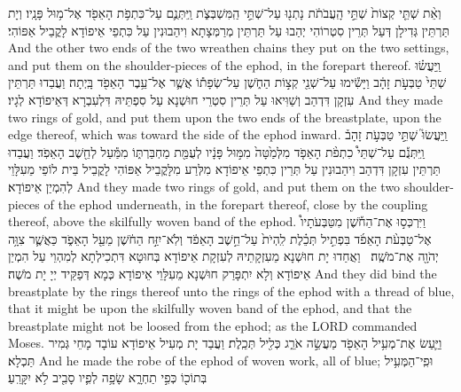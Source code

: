 {%
{וְאֵ֨ת שְׁתֵּ֤י קְצוֹת֙ שְׁתֵּ֣י הָֽעֲבֹתֹ֔ת נָתְנ֖וּ עַל־שְׁתֵּ֣י הַֽמִּשְׁבְּצֹ֑ת וַֽיִּתְּנֻ֛ם עַל־כִּתְפֹ֥ת הָאֵפֹ֖ד אֶל־מ֥וּל פָּנָֽיו׃}
{וְיָת תַּרְתֵּין גְּדִילָן דְּעַל תְּרֵין סִטְרוֹהִי יְהַבוּ עַל תַּרְתֵּין מְרַמְּצָתָא וִיהַבוּנִין עַל כִּתְפֵי אֵיפוֹדָא לָקֳבֵיל אַפּוֹהִי׃}
{And the other two ends of the two wreathen chains they put on the two settings, and put them on the shoulder-pieces of the ephod, in the forepart thereof.}{}
{וַֽיַּעֲשׂ֗וּ שְׁתֵּי֙ טַבְּעֹ֣ת זָהָ֔ב וַיָּשִׂ֕ימוּ עַל־שְׁנֵ֖י קְצ֣וֹת הַחֹ֑שֶׁן עַל־שְׂפָת֕וֹ אֲשֶׁ֛ר אֶל־עֵ֥בֶר הָאֵפֹ֖ד בָּֽיְתָה׃}
{וַעֲבַדוּ תַּרְתֵּין עִזְקָן דִּדְהַב וְשַׁוִּיאוּ עַל תְּרֵין סִטְרֵי חוּשְׁנָא עַל סִפְתֵּיהּ דִּלְעִבְרָא דְּאֵיפוֹדָא לְגָיו׃}
{And they made two rings of gold, and put them upon the two ends of the breastplate, upon the edge thereof, which was toward the side of the ephod inward.}{}
{וַֽיַּעֲשׂוּ֮ שְׁתֵּ֣י טַבְּעֹ֣ת זָהָב֒ וַֽיִּתְּנֻ֡ם עַל־שְׁתֵּי֩ כִתְפֹ֨ת הָאֵפֹ֤ד מִלְּמַ֙טָּה֙ מִמּ֣וּל פָּנָ֔יו לְעֻמַּ֖ת מַחְבַּרְתּ֑וֹ מִמַּ֕עַל לְחֵ֖שֶׁב הָאֵפֹֽד׃}
{וַעֲבַדוּ תַּרְתֵּין עִזְקָן דִּדְהַב וִיהַבוּנִין עַל תְּרֵין כִּתְפֵי אֵיפוֹדָא מִלְּרַע מִלָּקֳבֵיל אַפּוֹהִי לָקֳבֵיל בֵּית לוֹפֵי מֵעִלָּוֵי לְהִמְיַן אֵיפוֹדָא׃}
{And they made two rings of gold, and put them on the two shoulder-pieces of the ephod underneath, in the forepart thereof, close by the coupling thereof, above the skilfully woven band of the ephod.}{}
{וַיִּרְכְּס֣וּ אֶת־הַחֹ֡שֶׁן מִטַּבְּעֹתָיו֩ אֶל־טַבְּעֹ֨ת הָאֵפֹ֜ד בִּפְתִ֣יל תְּכֵ֗לֶת לִֽהְיֹת֙ עַל־חֵ֣שֶׁב הָאֵפֹ֔ד וְלֹֽא־יִזַּ֣ח הַחֹ֔שֶׁן מֵעַ֖ל הָאֵפֹ֑ד כַּאֲשֶׁ֛ר צִוָּ֥ה יְהֹוָ֖ה אֶת־מֹשֶֽׁה׃ \petucha }
{וַאֲחַדוּ יָת חוּשְׁנָא מֵעִזְקָתֵיהּ לְעִזְקָת אֵיפוֹדָא בְּחוּטָא דִּתְכִילְתָא לְמִהְוֵי עַל הִמְיַן אֵיפוֹדָא וְלָא יִתְפָּרַק חוּשְׁנָא מֵעִלָּוֵי אֵיפוֹדָא כְּמָא דְּפַקֵּיד יְיָ יָת מֹשֶׁה׃}
{And they did bind the breastplate by the rings thereof unto the rings of the ephod with a thread of blue, that it might be upon the skilfully woven band of the ephod, and that the breastplate might not be loosed from the ephod; as the LORD commanded Moses.}{}
{וַיַּ֛עַשׂ אֶת־מְעִ֥יל הָאֵפֹ֖ד מַעֲשֵׂ֣ה אֹרֵ֑ג כְּלִ֖יל תְּכֵֽלֶת׃}
{וַעֲבַד יָת מְעִיל אֵיפוֹדָא עוֹבָד מָחֵי גְּמִיר תַּכְלָא׃}
{And he made the robe of the ephod of woven work, all of blue;}{}
{וּפִֽי־הַמְּעִ֥יל בְּתוֹכ֖וֹ כְּפִ֣י תַחְרָ֑א שָׂפָ֥ה לְפִ֛יו סָבִ֖יב לֹ֥א יִקָּרֵֽעַ׃}
}
